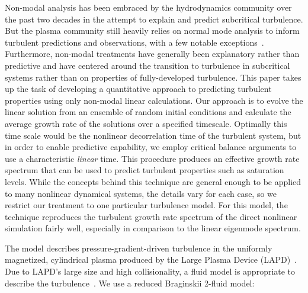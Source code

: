 \documentclass[letter,scriptaddress,twocolumn, prl,showkeys]{revtex4}
\begin{document}
Non-modal analysis has been embraced by the hydrodynamics community over the past two decades in the attempt to explain and predict subcritical turbulence. But the plasma community
still heavily relies on normal mode analysis to inform turbulent predictions and observations, with a few notable exceptions~\cite{camargo1998,camporeale2010,schekochihin2012}. 
Furthermore, non-modal treatments have generally been explanatory rather than predictive and have centered around the transition to turbulence in subcritical systems rather 
than on properties of fully-developed turbulence.
This paper takes up the task of developing a quantitative approach to predicting turbulent properties using only non-modal linear calculations. 
Our approach is to evolve the linear solution from an ensemble of random initial conditions 
and calculate the average growth rate of the solutions over a specified timescale.  Optimally this time scale would be the
nonlinear decorrelation time of the turbulent system, but in order to enable predictive capability, we employ critical balance
arguments to use a characteristic \emph{linear} time.
This procedure produces an effective growth rate spectrum that can be used to predict turbulent properties such as saturation levels.
While the concepts behind this technique are general enough to be applied to many nonlinear dynamical systems, the details vary for each case, 
so we restrict our treatment to one particular turbulence model. For this model, the technique reproduces the turbulent growth rate spectrum of the direct nonlinear simulation fairly well, especially
in comparison to the linear eigenmode spectrum.

The model describes pressure-gradient-driven turbulence in the uniformly magnetized, cylindrical plasma
produced by the Large Plasma Device (LAPD)~\cite{gekelman1991}. 
Due to LAPD's large size and high collisionality, a fluid model is
appropriate to describe the turbulence~\cite{Popovich2010a,Popovich2010b,Umansky2011}. We use a reduced Braginskii 2-fluid model:
\end{document}
